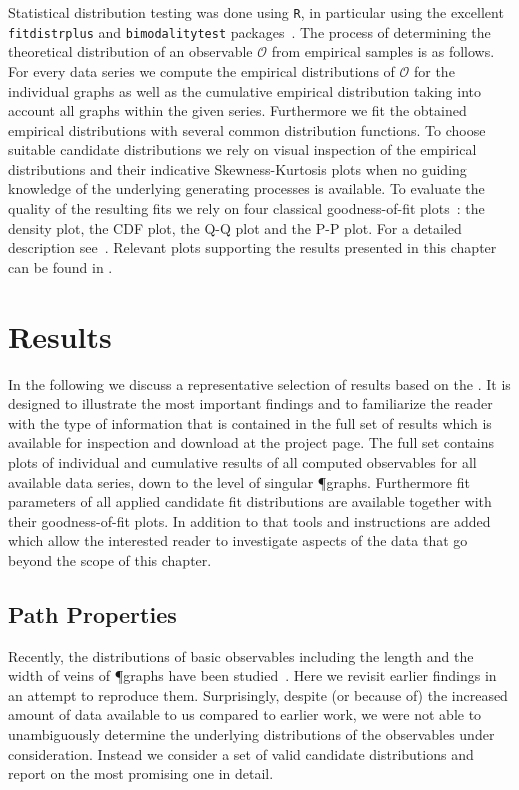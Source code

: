 		Statistical distribution testing was done using \verb+R+, in particular using the excellent \verb+fitdistrplus+ and \verb+bimodalitytest+ packages~\cite{delignette2015fitdistrplus}. The process of determining the theoretical distribution of an observable $\mathcal{O}$ from empirical samples is as follows. For every data series we compute the empirical distributions of $\mathcal{O}$ for the individual graphs as well as the cumulative empirical distribution taking into account all graphs within the given series. Furthermore we fit the obtained empirical distributions with several common distribution functions. To choose suitable candidate distributions we rely on visual inspection of the empirical distributions and their indicative Skewness-Kurtosis plots when no guiding knowledge of the underlying generating processes is available. To evaluate the quality of the resulting fits we rely on four classical goodness-of-fit plots~\cite{cullen1999probabilistic}: the density plot, the CDF plot, the Q-Q plot and the P-P plot. For a detailed description see~\cite{delignette2015fitdistrplus}. Relevant plots supporting the results presented in this chapter can be found in .
		
\section{Results}\label{sec:analysis_results}

	In the following we discuss a representative selection of results based on the \data. It is designed to illustrate the most important findings and to familiarize the reader with the type of information that is contained in the full set of results which is available for inspection and download at the \SMGR project page. The full set contains plots of individual and cumulative results of all computed observables for all available data series, down to the level of singular \P graphs. Furthermore fit parameters of all applied candidate fit distributions are available together with their goodness-of-fit plots. In addition to that tools and instructions are added which allow the interested reader to investigate aspects of the data that go beyond the scope of this chapter.

	\subsection{Path Properties}

		Recently, the distributions of basic observables including the length and the width of veins of \P graphs have been studied~\cite{baumgarten2010plasmodial}. Here we revisit earlier findings in an attempt to reproduce them. Surprisingly, despite (or because of) the increased amount of data available to us compared to earlier work, we were not able to unambiguously determine the underlying distributions of the observables under consideration. Instead we consider a set of valid candidate distributions and report on the most promising one in detail. 

